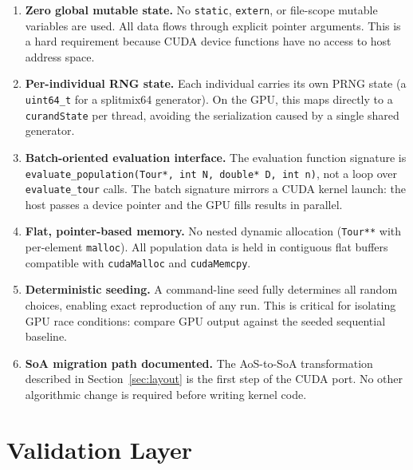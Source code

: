 \documentclass[11pt, letterpaper]{article}
\begin{document}
\begin{enumerate}[label=\textbf{CR-\arabic*.}, leftmargin=*, itemsep=0.5em]

  \item \textbf{Zero global mutable state.}
    No \texttt{static}, \texttt{extern}, or file-scope mutable variables are
    used.  All data flows through explicit pointer arguments.  This is a
    hard requirement because CUDA device functions have no access to host
    address space.

  \item \textbf{Per-individual RNG state.}
    Each individual carries its own PRNG state (a \texttt{uint64\_t} for a
    splitmix64 generator).  On the GPU, this maps directly to a
    \texttt{curandState} per thread, avoiding the serialization caused by a
    single shared generator.

  \item \textbf{Batch-oriented evaluation interface.}
    The evaluation function signature is
    \texttt{evaluate\_population(Tour*, int N, double* D, int n)}, not a loop
    over \texttt{evaluate\_tour} calls.  The batch signature mirrors a CUDA
    kernel launch: the host passes a device pointer and the GPU fills results
    in parallel.

  \item \textbf{Flat, pointer-based memory.}
    No nested dynamic allocation (\texttt{Tour**} with per-element
    \texttt{malloc}).  All population data is held in contiguous flat buffers
    compatible with \texttt{cudaMalloc} and \texttt{cudaMemcpy}.

  \item \textbf{Deterministic seeding.}
    A command-line seed fully determines all random choices, enabling exact
    reproduction of any run.  This is critical for isolating GPU race
    conditions: compare GPU output against the seeded sequential baseline.

  \item \textbf{SoA migration path documented.}
    The AoS-to-SoA transformation described in Section~\ref{sec:layout} is
    the first step of the CUDA port.  No other algorithmic change is required
    before writing kernel code.

\end{enumerate}

\section{Validation Layer}
\label{sec:validation}
\end{document}
